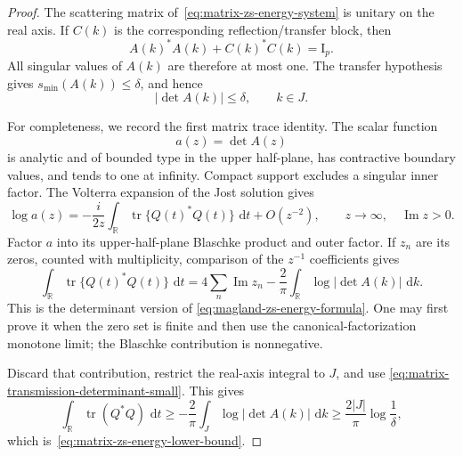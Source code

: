 \documentclass[11pt]{article}
\theoremstyle{remark}
\newcommand{\Id}{\mathrm I}
\newcommand{\dd}{\,\mathrm d}
\newcommand{\tr}{\operatorname{tr}}
\begin{document}
\begin{proof}
The scattering matrix of~\eqref{eq:matrix-zs-energy-system} is unitary on the
real axis.  If $C(k)$ is the corresponding reflection/transfer block, then
\begin{equation}
 A(k)^*A(k)+C(k)^*C(k)=\Id_p.
 \label{eq:matrix-zs-unitarity}
\end{equation}
All singular values of $A(k)$ are therefore at most one.  The transfer
hypothesis gives $s_{\min}(A(k))\leq\delta$, and hence
\begin{equation}
 |\det A(k)|\leq\delta,\qquad k\in J.
 \label{eq:matrix-transmission-determinant-small}
\end{equation}

For completeness, we record the first matrix trace identity.  The scalar
function
\[
 a(z)=\det A(z)
\]
is analytic and of bounded type in the upper half-plane, has contractive
boundary values, and tends to one at infinity.  Compact support excludes a
singular inner factor.  The Volterra expansion of the Jost solution gives
\begin{equation}
 \log a(z)
 =
 -\frac{i}{2z}
 \int_{\mathbb R}\tr\{Q(t)^*Q(t)\}\,\dd t
 +O(z^{-2}),
 \qquad z\longrightarrow\infty,\quad\operatorname{Im}z>0.
 \label{eq:matrix-transmission-high-energy}
\end{equation}
Factor $a$ into its upper-half-plane Blaschke product and outer factor.  If
$z_n$ are its zeros, counted with multiplicity, comparison of the
$z^{-1}$ coefficients gives
\begin{equation}
 \int_{\mathbb R}\tr\{Q(t)^*Q(t)\}\,\dd t
 =
 4\sum_n\operatorname{Im}z_n
 -
 \frac2\pi\int_{\mathbb R}\log|\det A(k)|\,\dd k .
 \label{eq:matrix-zs-first-trace-identity}
\end{equation}
This is the determinant version of
\eqref{eq:magland-zs-energy-formula}.  One may first prove it when the zero
set is finite and then use the canonical-factorization monotone limit; the
Blaschke contribution is nonnegative.

Discard that contribution, restrict the real-axis integral to $J$, and use
\eqref{eq:matrix-transmission-determinant-small}.  This gives
\[
 \int_{\mathbb R}\tr(Q^*Q)\,\dd t
 \geq
 -\frac2\pi\int_J\log|\det A(k)|\,\dd k
 \geq
 \frac{2|J|}{\pi}\log\frac1\delta,
\]
which is~\eqref{eq:matrix-zs-energy-lower-bound}.
\end{proof}
\end{document}
